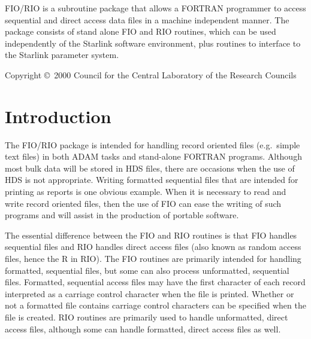 \documentclass[twoside,11pt]{article}
\newcommand{\stardocinitials}  {SUN}
\newcommand{\stardocnumber}    {143.4}
\newcommand{\stardoccopyright} 
{Copyright \copyright\ 2000 Council for the Central Laboratory of the Research Councils}
\newcommand{\stardocabstract}
{FIO/RIO is a subroutine package that allows a FORTRAN programmer to access
sequential and direct access data files in a machine independent manner. The
package consists of stand alone FIO and RIO routines, which can be used
independently of the Starlink software environment, plus routines to interface 
to the Starlink parameter system.}
\newcommand{\stardocname}{\stardocinitials /\stardocnumber}
\newenvironment{latexonly}{}{}
\renewcommand{\_}{\texttt{\symbol{95}}}
\renewcommand{\thepage}{\roman{page}}
\begin{document}
\stardocabstract

\begin{latexonly}
\newpage
\vspace*{\fill}
\stardoccopyright
\end{latexonly}

  \newpage
  \begin{latexonly}
    \setlength{\parskip}{0mm}
    \tableofcontents
    \setlength{\parskip}{\medskipamount}
    \markboth{\stardocname}{\stardocname}
  \end{latexonly}

\cleardoublepage
\renewcommand{\thepage}{\arabic{page}}
\setcounter{page}{1}

\section{Introduction}

The FIO/RIO package is intended for handling record oriented files 
(e.g.\ simple text files) in both ADAM tasks and stand-alone FORTRAN programs.
Although most bulk data will be stored in HDS files, there are occasions when
the use of HDS is not appropriate. Writing formatted sequential files that are
intended for printing as reports is one obvious example. When it is necessary
to read and write record oriented files, then the use of FIO can ease the
writing of such programs and will assist in the production of portable
software.

The essential difference between the FIO and RIO routines is that FIO handles
sequential files and RIO handles direct access files (also known as random
access files, hence the R in RIO). The FIO routines are primarily intended for
handling formatted, sequential files, but some can also process unformatted,
sequential files. Formatted, sequential access files may have the first
character of each record interpreted as a carriage control character when the
file is printed. Whether or not a formatted file contains carriage control
characters can be specified when the file is created. RIO routines are
primarily used to handle unformatted, direct access files, although some can
handle formatted, direct access files as well.
\end{document}
